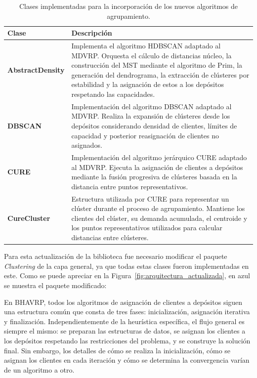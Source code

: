 \begin{table}[H]
\centering
\caption{Clases implementadas para la incorporaci\'on de los nuevos algoritmos de agrupamiento.}
\label{tab:clases}
\small
\begin{tabular}{@{}lp{10cm}@{}}
\toprule
\textbf{Clase} & \textbf{Descripci\'on} \\
\midrule
\textbf{AbstractDensity} & Implementa el algoritmo HDBSCAN adaptado al MDVRP. Orquesta el cálculo de distancias núcleo, la construcción del MST mediante el algoritmo de Prim, la generación del dendrograma, la extracción de clústeres por estabilidad y la asignación de estos a los depósitos respetando las capacidades. \\
\textbf{DBSCAN} & Implementaci\'on del algoritmo DBSCAN adaptado al MDVRP. Realiza la expansi\'on de cl\'usteres desde los dep\'ositos considerando densidad de clientes, l\'imites de capacidad y posterior reasignaci\'on de clientes no asignados. \\
\textbf{CURE} & Implementaci\'on del algoritmo jer\'arquico CURE adaptado al MDVRP. Ejecuta la asignaci\'on de clientes a dep\'ositos mediante la fusi\'on progresiva de cl\'usteres basada en la distancia entre puntos representativos. \\
\textbf{CureCluster} & Estructura utilizada por CURE para representar un cl\'uster durante el proceso de agrupamiento. Mantiene los clientes del cl\'uster, su demanda acumulada, el centroide y los puntos representativos utilizados para calcular distancias entre cl\'usteres. \\
\bottomrule
\end{tabular}
\end{table}

Para esta actualizaci\'on de la biblioteca fue necesario modificar el paquete \textit{Clustering} de la capa general, ya que todas estas clases fueron implementadas en este. Como se puede apreciar en la Figura~\ref{fig:arquitectura_actualizada}, en azul se muestra el paquete modificado:


En BHAVRP, todos los algoritmos de asignaci\'on de clientes a dep\'ositos siguen una estructura com\'un que consta de tres fases: inicializaci\'on, asignaci\'on iterativa y finalizaci\'on. Independientemente de la heur\'istica espec\'ifica, el flujo general es siempre el mismo: se preparan las estructuras de datos, se asignan los clientes a los dep\'ositos respetando las restricciones del problema, y se construye la soluci\'on final. Sin embargo, los detalles de c\'omo se realiza la inicializaci\'on, c\'omo se asignan los clientes en cada iteraci\'on y c\'omo se determina la convergencia var\'ian de un algoritmo a otro.

